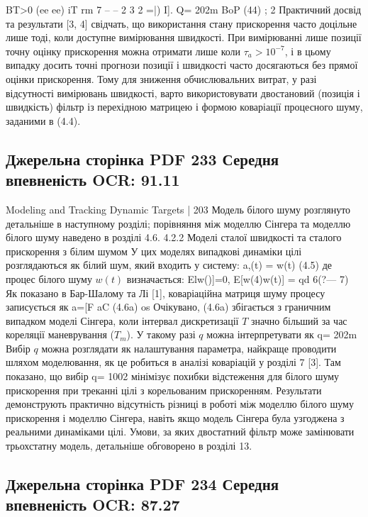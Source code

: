 \documentclass[11pt]{article}
\begin{document}
BT>0
(ee ee)
iT rm 7
-- -- 2 3 2
=|) I]. Q= 202m BoP (44)
; 2
Практичний досвід та результати [3, 4] свідчать, що використання стану
прискорення часто доцільне лише тоді, коли доступне вимірювання швидкості.
При вимірюванні лише позиції точну оцінку прискорення можна отримати лише
коли $\tau_a > 10^{-7}$, і в цьому випадку досить точні прогнози позиції і
швидкості часто досягаються без прямої оцінки прискорення. Тому для зниження
обчислювальних витрат, у разі відсутності вимірювань швидкості, варто
використовувати двостановий (позиція і швидкість) фільтр із перехідною матрицею
і формою коваріації процесного шуму, заданими в (4.4).
\clearpage\subsection*{Джерельна сторінка PDF 233 \quad Середня впевненість OCR: 91.11}
Modeling and Tracking Dynamic Targets | 203
Модель білого шуму розглянуто детальніше в наступному розділі; порівняння
між моделлю Сінгера та моделлю білого шуму наведено в розділі 4.6.
4.2.2 Моделі сталої швидкості та сталого прискорення з білим шумом
У цих моделях випадкові динаміки цілі розглядаються як білий шум, який
входить у систему:
a,(t) = w(t) (4.5)
де процес білого шуму $w(t)$ визначається:
Elw()]=0, E[w(4)w(t)] = qd 6(?--- 7)
Як показано в Бар-Шалому та Лі [1], коваріаційна матриця шуму процесу
записується як
a=[F aC (4.6a)
os
Очікувано, (4.6a) збігається з граничним випадком моделі Сінгера,
коли інтервал дискретизації $T$ значно більший за час кореляції маневрування ($T_m$).
У такому разі $q$ можна інтерпретувати як
q= 202m
Вибір $q$ можна розглядати як налаштування параметра, найкраще
проводити шляхом моделювання, як це робиться в аналізі коваріацій у розділі 7
[3]. Там показано, що вибір
q= 1002
мінімізує похибки відстеження для білого шуму прискорення при треканні цілі
з корельованим прискоренням. Результати демонструють практично відсутність різниці
в роботі між моделлю білого шуму прискорення і моделлю Сінгера, навіть якщо модель
Сінгера була узгоджена з реальними динаміками цілі.
Умови, за яких двостатний фільтр може замінювати трьохстатну модель,
детальніше обговорено в розділі 13.
\clearpage\subsection*{Джерельна сторінка PDF 234 \quad Середня впевненість OCR: 87.27}
\end{document}
